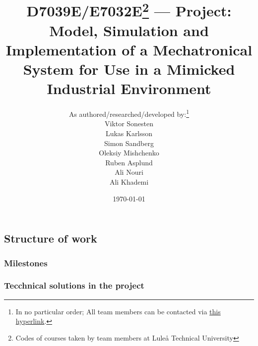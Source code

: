 \documentclass[twocolumn]{article}
\title{
D7039E/E7032E\footnote{Codes of courses taken by team members at Luleå Technical University}
--- Project: Model, Simulation and Implementation of a Mechatronical System for Use in a Mimicked Industrial Environment
}
\author{
As authored/researched/developed by:\footnote{In no particular order; All team members can be contacted via \href{mailto:vikson-6@student.ltu.se;lukkar-4@student.ltu.se;sansim-6@student.ltu.se;olemis-6@student.ltu.se;rubasp-6@student.ltu.se;alinou-6@student.ltu.se;alikhar-6@student.ltu.se}{this hyperlink}.} \\
Viktor Sonesten \hypermail{vikson-6@student.ltu.se} \\
Lukas Karlsson \hypermail{lukkar-4@student.ltu.se} \\
Simon Sandberg \hypermail{sansim-6@student.ltu.se} \\
Oleksiy Mishchenko \hypermail{olemis-6@student.ltu.se} \\
Ruben Asplund \hypermail{rubasp-6@student.ltu.se} \\
Ali Nouri \hypermail{alinou-6@student.ltu.se} \\
Ali Khademi \hypermail{alikha-6@student.ltu.se}
}
\date{\today}
\begin{document}
\maketitle







\appendix




\subsection{Structure of work}
\subsubsection{Milestones}
\subsubsection{Tecchnical solutions in the project}

\printbibliography
\end{document}
